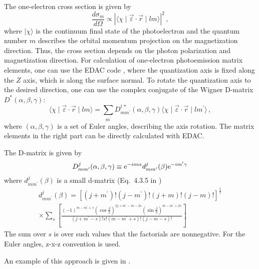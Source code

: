 \documentclass[a4paper,oneside,12pt]{extarticle}
\begin{document}
The one-electron cross section is given by
\begin{equation}
\frac{d \sigma_m}{d \Omega} \propto
| \langle \chi \mid \vec{\varepsilon} \cdot \vec{r} \mid lm \rangle |^2 \,,
\end{equation}
where $|\chi\rangle$ is the continuum final state of the photoelectron and the quantum number $m$ describes the orbital momentum projection on the magnetization direction. Thus, the cross section depends on the photon polarization and magnetization direction. For calculation of one-electron photoemission matrix elements, one can use the EDAC code \cite{Fadley_PRB_2001}, where the quantization axis is fixed along the $Z$ axis, which is along the surface normal. To rotate the quantization axis to the desired direction, one can use the complex conjugate of the Wigner D-matrix $D^*(\alpha,\beta,\gamma)$:
\begin{equation}
\langle \chi \mid \vec{\varepsilon} \cdot \vec{r} \mid lm \rangle = \sum_{m^{\prime}} D^{l\,*}_{m m^{\prime}}(\alpha,\beta,\gamma) \langle \chi \mid \vec{\varepsilon} \cdot \vec{r} \mid lm^{\prime} \rangle \,,
\end{equation}
where $(\alpha,\beta,\gamma)$ is a set of Euler angles, describing the axis rotation. The matrix elements in the right part can be directly calculated with EDAC.

The D-matrix is given by
$$
D^j_{m m^{\prime}}(\alpha,\beta,\gamma) \equiv
{\rm e}^{-i m \alpha} d^j_{m m^{\prime}}(\beta) {\rm e}^{-i m^{\prime} \gamma}
$$
where $d^j_{m m^{\prime}}(\beta)$ is a small d-matrix (Eq.~4.3.5 in \cite{Varshalovich})
\begin{multline}
d^j_{m m^{\prime}}(\beta) = 
\left[ (j+m^{\prime})! (j-m^{\prime})! (j+m)! (j-m)!\right]^{\frac{1}{2}} \\
\times \sum_s \left[ 
\frac{(-1)^{m-m^{\prime}+s}\left(\cos\frac{\beta}{2}\right)^{2j+m^{\prime}-m-2s}\left(\sin\frac{\beta}{2}\right)^{m-m^{\prime}+2s}}{(j+m^{\prime}-s)! s! (m-m^{\prime}+s)! (j-m-s)!} \right]
\end{multline} 
The sum over $s$ is over such values that the factorials are nonnegative. For the Euler angles, z-x-z convention is used.

An example of this approach is given in \cite{Usachov_PED_PRB_2020}.

\end{document}
